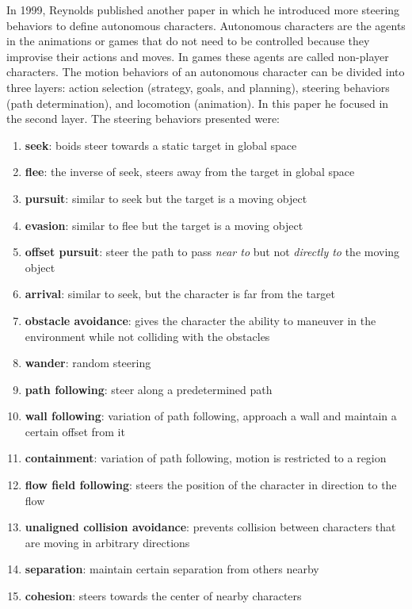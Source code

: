 In 1999, Reynolds published another paper in which he introduced more steering behaviors to define autonomous characters\cite{craigSteeringBehaviors}. Autonomous characters are the agents in the animations or games that do not need to be controlled because they improvise their actions and moves. In games these agents are called non-player characters. The motion behaviors of an autonomous character can be divided into three layers: action selection (strategy, goals, and planning), steering behaviors (path determination), and locomotion (animation). In this paper he focused in the second layer. The steering behaviors presented were:
\begin{enumerate}
\item \textbf{seek}: boids steer towards a static target in global space
\item \textbf{flee}: the inverse of seek, steers away from the target in global space
\item \textbf{pursuit}: similar to seek but the target is a moving object
\item \textbf{evasion}: similar to flee but the target is a moving object
\item \textbf{offset pursuit}: steer the path to pass \textit{near to} but not \textit{directly to} the moving object
\item \textbf{arrival}: similar to seek, but the character is far from the target
\item \textbf{obstacle avoidance}: gives the character the ability to maneuver in the environment while not colliding with the obstacles 
\item \textbf{wander}: random steering
\item \textbf{path following}: steer along a predetermined path
\item \textbf{wall following}: variation of path following, approach a wall and maintain a certain offset from it
\item \textbf{containment}: variation of path following, motion is restricted to a region
\item \textbf{flow field following}: steers the position of the character in direction to the flow
\item \textbf{unaligned collision avoidance}: prevents collision between characters that are moving in arbitrary directions
\item \textbf{separation}: maintain certain separation from others nearby
\item \textbf{cohesion}: steers towards the center of nearby characters

\end{enumerate}
